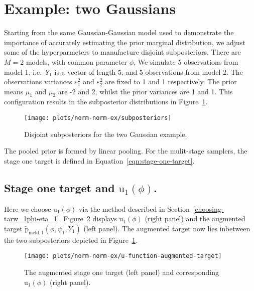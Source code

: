 \documentclass[10pt,a4paper,]{article}
\newcommand{\pd}{\text{p}}
\newcommand{\Nm}{M}
\begin{document}
\section{Example: two Gaussians}\label{example-two-gaussians}

Starting from the same Gaussian-Gaussian model used to demonstrate the
importance of accurately estimating the prior marginal distribution, we
adjust some of the hyperparmeters to manufacture disjoint subposteriors.
There are \(\Nm = 2\) models, with common parameter \(\phi\),
 We simulate 5
observations from model 1, i.e.~\(Y_{1}\) is a vector of length 5, and 5
observations from model 2. The observations variances
\(\varepsilon_{1}^{2}\) and \(\varepsilon_{2}^{2}\) are fixed to 1 and 1
respectively. The prior means \(\mu_{1}\) and \(\mu_{2}\) are -2 and 2,
whilst the prior variances are 1 and 1. This configuration results in
the subposterior distributions in Figure~\ref{fig:subposteriors}.

\begin{figure}

{\centering \texttt{[image: plots/norm-norm-ex/subposteriors]} 

}

\caption{Disjoint subposteriors for the two Gaussian example.}\label{fig:subposteriors}
\end{figure}

The pooled prior is formed by linear pooling. For the mulit-stage
samplers, the stage one target is defined in
Equation~\eqref{eqn:stage-one-target}.

\subsection{\texorpdfstring{Stage one target and
\(\text{u}_{1}(\phi)\).}{Stage one target and \textbackslash{}text\{u\}\_\{1\}(\textbackslash{}phi).}}\label{stage-one-target-and-textu_1phi.}

Here we choose \(\text{u}_{1}(\phi)\) via the method described in
Section~\ref{choosing-tarw_1phi-eta_1}.
Figure~\ref{fig:u_func_augmented_target} displays \(\text{u}_{1}(\phi)\)
(right panel) and the augmented target
\(\tilde{\pd}_{\text{meld}, 1}(\phi, \psi_{1}, Y_{1})\) (left panel).
The augmented target now lies inbetween the two subposteriors depicted
in Figure~\ref{fig:subposteriors}.

\begin{figure}

{\centering \texttt{[image: plots/norm-norm-ex/u-function-augmented-target]} 

}

\caption{The augmented stage one target (left panel) and corresponding $\text{u}_{1}(\phi)$ (right panel).}\label{fig:u_func_augmented_target}
\end{figure}
\end{document}
